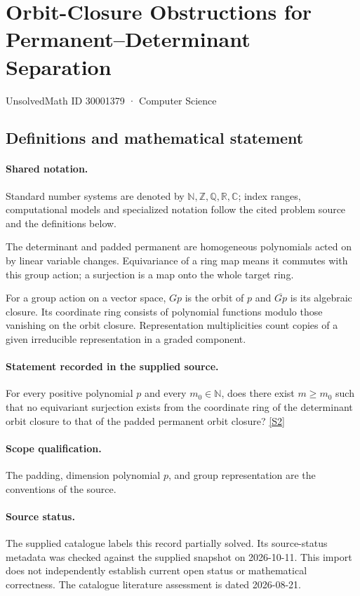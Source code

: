 \documentclass[11pt]{article}
\newcommand{\sref}[2]{\hyperlink{source:#1:#2}{[S#2]}}
\begin{document}
\setcounter{section}{30001378}
\section{Orbit-Closure Obstructions for Permanent–Determinant Separation}\label{30001379}
{\small\sffamily UnsolvedMath ID 30001379 · Computer Science}
\subsection{Definitions and mathematical statement}

\paragraph{Shared notation.}Standard number systems are denoted by $\mathbb N,\mathbb Z,\mathbb Q,\mathbb R,\mathbb C$; index ranges, computational models and specialized notation follow the cited problem source and the definitions below.


The determinant and padded permanent are homogeneous polynomials acted on by linear variable changes. Equivariance of a ring map means it commutes with this group action; a surjection is a map onto the whole target ring.

For a group action on a vector space, $Gp$ is the orbit of $p$ and $\overline{Gp}$ is its algebraic closure. Its coordinate ring consists of polynomial functions modulo those vanishing on the orbit closure. Representation multiplicities count copies of a given irreducible representation in a graded component.
\paragraph{Statement recorded in the supplied source.}
For every positive polynomial $p$ and every $m_0\in\mathbb{N}$, does there exist $m\geq m_0$ such that no equivariant surjection exists from the coordinate ring of the determinant orbit closure to that of the padded permanent orbit closure? \sref{30001379}{2}
\paragraph{Scope qualification.}
The padding, dimension polynomial $p$, and group representation are the conventions of the source.
\paragraph{Source status.}
The supplied catalogue labels this record partially solved. Its source-status metadata was checked against the supplied snapshot on 2026-10-11. This import does not independently establish current open status or mathematical correctness. The catalogue literature assessment is dated 2026-08-21.
\end{document}
